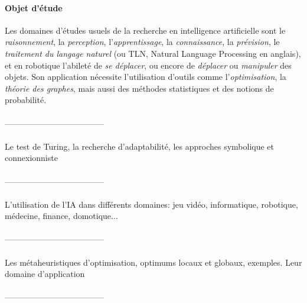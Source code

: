\paragraph{Objet d'étude} Les domaines d'études usuels de la recherche en intelligence artificielle sont le
\emph{raisonnement}, la \emph{perception}, l'\emph{apprentissage}, la \emph{connaissance}, la
\emph{prévision}, le \emph{traitement du langage naturel} (ou TLN, Natural Language Processing en anglais),
et en robotique l'abileté de \emph{se déplacer}, ou encore de \emph{déplacer} ou \emph{manipuler} des
objets. Son application nécessite l'utilisation d'outils comme l'\emph{optimisation}, la \emph{théorie des graphes},
mais aussi des méthodes statistiques et des notions de probabilité. 

\paragraph{} ------------------------------------

\paragraph{} Le test de Turing, la recherche d'adaptabilité, les approches symbolique et connexionniste

\paragraph{} ------------------------------------

\paragraph{} L'utilisation de l'IA dans différents domaines: jeu vidéo, informatique,
robotique, médecine, finance, domotique...

\paragraph{} ------------------------------------

\paragraph{} Les métaheuristiques d'optimisation, optimums locaux et globaux, exemples. 
Leur domaine d'application

\paragraph{} ------------------------------------

